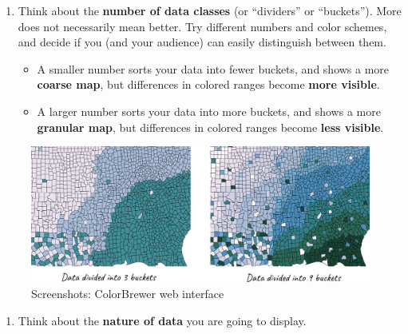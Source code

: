 \documentclass[
  english,
]{book}
\providecommand{\tightlist}{%
  \setlength{\itemsep}{0pt}\setlength{\parskip}{0pt}}
\begin{document}
\begin{enumerate}
\def\labelenumi{\arabic{enumi})}
\tightlist
\item
  Think about the \textbf{number of data classes} (or ``dividers'' or ``buckets''). More does not necessarily mean better. Try different numbers and color schemes, and decide if you (and your audience) can easily distinguish between them.

  \begin{itemize}
  \tightlist
  \item
    A smaller number sorts your data into fewer buckets, and shows a more \textbf{coarse map}, but differences in colored ranges become \textbf{more visible}.
  \item
    A larger number sorts your data into more buckets, and shows a more \textbf{granular map}, but differences in colored ranges become \textbf{less visible}.
  \end{itemize}
\end{enumerate}

\begin{figure}
\centering
\includegraphics{images/06-map/Map - ColorBrewer - Classes.png}
\caption{Screenshots: ColorBrewer web interface}
\end{figure}

\begin{enumerate}
\def\labelenumi{\arabic{enumi})}
\setcounter{enumi}{1}
\tightlist
\item
  Think about the \textbf{nature of data} you are going to display.
\end{enumerate}
\end{document}
